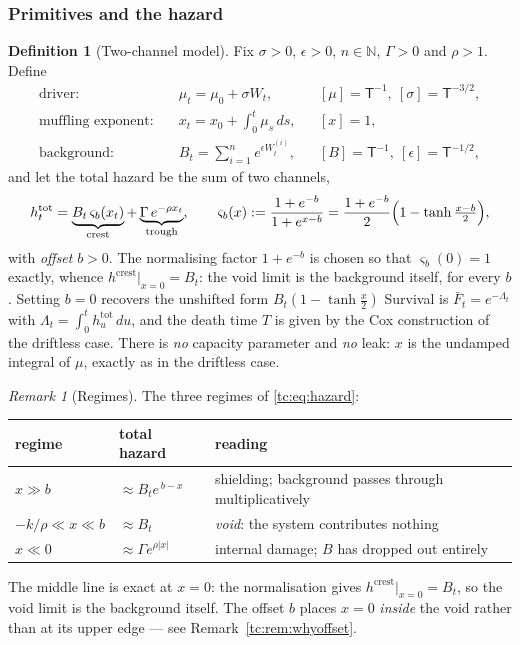 \documentclass[11pt]{article}
\numberwithin{equation}{section}
\theoremstyle{plain}
\theoremstyle{definition}
\newtheorem{definition}[theorem]{Definition}
\theoremstyle{remark}
\newtheorem{remark}[theorem]{Remark}
\begin{document}
\subsubsection{Primitives and the hazard}\label{tc:subsub:primitives}

\begin{definition}[Two-channel model]\label{tc:def:model}
Fix $\sigma>0$, $\epsilon>0$, $n\in\mathbb N$, $\Gamma>0$ and
$\rho>1$. Define
\begin{align}
\text{driver:}&\quad \mu_t=\mu_0+\sigma W_t,
&&[\mu]=\mathsf T^{-1},\ [\sigma]=\mathsf T^{-3/2},
\label{tc:eq:driver}\\
\text{muffling exponent:}&\quad x_t=x_0+\int_0^t\mu_s\,ds,
&&[x]=1,
\label{tc:eq:x}\\
\text{background:}&\quad B_t=\sum_{i=1}^{n}e^{\epsilon W^{(i)}_t},
&&[B]=\mathsf T^{-1},\ [\epsilon]=\mathsf T^{-1/2},
\label{tc:eq:B}
\end{align}
and let the total hazard be the sum of two channels,
\begin{equation}\label{tc:eq:hazard}
h^{\mathrm{tot}}_t
=\underbrace{B_t\,\varsigma_b(x_t)}_{\text{crest}}
+\underbrace{\Gamma\,e^{-\rho x_t}}_{\text{trough}},
\qquad
\varsigma_b(x):=\frac{1+e^{-b}}{1+e^{x-b}}
=\frac{1+e^{-b}}{2}\Bigl(1-\tanh\tfrac{x-b}{2}\Bigr),
\end{equation}
with \emph{offset} $b>0$. The normalising factor $1+e^{-b}$ is chosen so
that $\varsigma_b(0)=1$ exactly, whence $h^{\mathrm{crest}}|_{x=0}=B_t$:
the void limit is the background itself, for every $b$. Setting $b=0$
recovers the unshifted form $B_t(1-\tanh\frac{x}{2})$
Survival is $\bar F_t=e^{-\Lambda_t}$ with
$\Lambda_t=\int_0^t h^{\mathrm{tot}}_u\,du$, and the death time $T$ is
given by the Cox construction of the driftless case. There is \emph{no}
capacity parameter and \emph{no} leak: $x$ is the undamped integral of
$\mu$, exactly as in the driftless case.
\end{definition}

\begin{remark}[Regimes]\label{tc:rem:regimes}
The three regimes of \eqref{tc:eq:hazard}:
\begin{center}\small
\begin{tabular}{@{}lll@{}}
\toprule
regime & total hazard & reading\\
\midrule
$x\gg b$ & $\approx B_te^{\,b-x}$ & shielding; background passes through
multiplicatively\\
$-k/\rho\ll x\ll b$ & $\approx B_t$ & \emph{void}: the system
contributes nothing\\
$x\ll0$ & $\approx\Gamma e^{\rho|x|}$ & internal damage; $B$ has dropped
out entirely\\
\bottomrule
\end{tabular}
\end{center}
The middle line is exact at $x=0$: the normalisation gives
$h^{\mathrm{crest}}|_{x=0}=B_t$, so the void limit is the background
itself. The offset $b$ places $x=0$ \emph{inside} the void rather than
at its upper edge --- see Remark~\ref{tc:rem:whyoffset}.
\end{remark}
\end{document}

